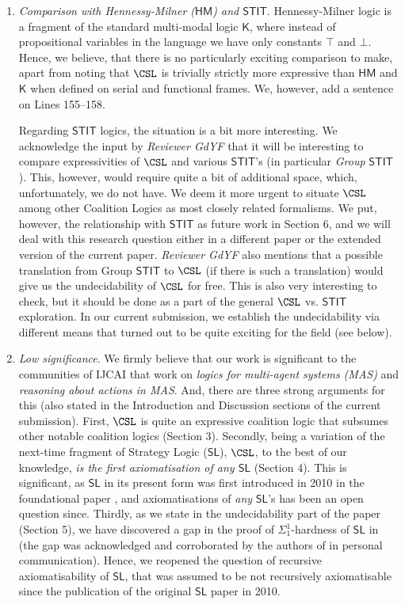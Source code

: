 \begin{enumerate}
    \item \textit{Comparison with Hennessy-Milner ($\mathsf{HM}$) and $\mathsf{STIT}$}. Hennessy-Milner logic is a fragment of the standard multi-modal logic $\mathsf{K}$, where instead of propositional variables in the language we have only constants $\top$ and $\bot$. Hence, we believe, that there is no particularly exciting comparison to make, apart from noting that $\CSL$ is trivially strictly more expressive than $\mathsf{HM}$ and $\mathsf{K}$ when defined on serial and functional frames. We, however, add a sentence on Lines 155--158.

    Regarding $\mathsf{STIT}$ logics, the situation is a bit more interesting.  We acknowledge the input by \textit{Reviewer GdYF} that it will be interesting to compare expressivities of $\CSL$ and various $\mathsf{STIT}$'s (in particular \textit{Group} $\mathsf{STIT}$). This, however, would require quite a bit of additional space, which, unfortunately, we do not have. We deem it more urgent to situate $\CSL$ among other Coalition Logics as most closely related formalisms. We put, however, the relationship with $\mathsf{STIT}$ as future work in Section 6, and we will deal with this research question either in a different paper or the extended version of the current paper. \textit{Reviewer GdYF} also mentions that a possible translation from Group $\mathsf{STIT}$ to $\CSL$ (if there is such a translation) would give us the undecidability of $\CSL$ for free. This is also very interesting to check, but it should be done as a part of the general $\CSL$ vs. $\mathsf{STIT}$ exploration. In our current submission, we establish the undecidability via different means that turned out to be quite exciting for the field (see below). 

    \item \textit{Low significance}. We firmly believe  that our work is significant to the communities of IJCAI that work on \textit{logics for multi-agent systems (MAS)} and \textit{reasoning about actions in MAS}. And, there are three strong arguments for this (also stated in the Introduction and Discussion sections of the current submission). First, $\CSL$ is quite an expressive coalition logic that subsumes other notable coalition logics (Section 3). Secondly, being a variation of the next-time fragment of Strategy Logic ($\mathsf{SL}$), $\CSL$, to the best of our knowledge, \textit{is the first axiomatisation of any $\mathsf{SL}$} (Section 4). This is significant, as $\mathsf{SL}$ in its present form was first introduced in 2010 in the foundational paper \cite{mogavero10}, and axiomatisations of \textit{any} $\mathsf{SL}$'s has been an open question since. Thirdly, as we state in the undecidability part of the paper (Section 5), we have discovered a gap in the proof of $\Sigma^1_1$-hardness of $\mathsf{SL}$ in \cite{mogavero10} (the gap was acknowledged and corroborated by the authors of \cite{mogavero10} in personal communication). Hence, we reopened the question of recursive axiomatisability of $\mathsf{SL}$, that was assumed to be not recursively axiomatisable since the publication of the original $\mathsf{SL}$ paper in 2010.  


\end{enumerate}
